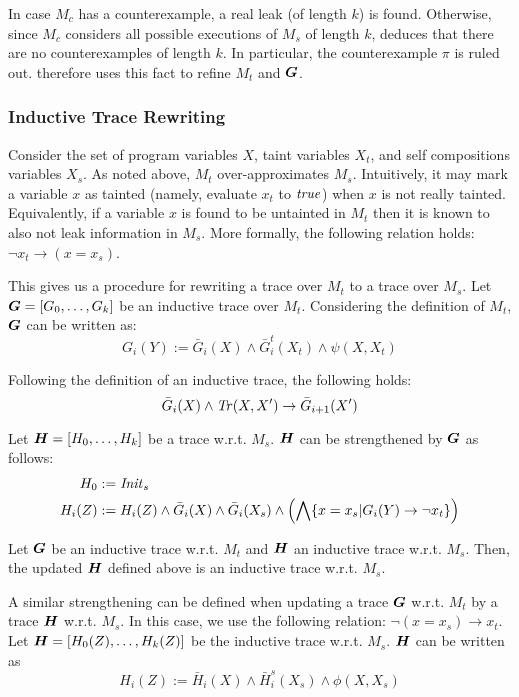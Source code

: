 In case $M_c$ has a counterexample, a real leak (of length $k$) is found. Otherwise, since $M_c$ considers all possible executions of $M_s$ of length $k$, \Ifc deduces that there are no counterexamples of length $k$. In particular, the counterexample $\pi$ is ruled out. \Ifc therefore uses this fact to refine $M_t$ and $\vG$.

\subsubsection{Inductive Trace Rewriting}

Consider the set of program variables $X$, taint variables $X_t$, and self compositions variables $X_s$. As noted above, $M_t$ over-approximates $M_s$. Intuitively, it may mark a variable $x$ as tainted (namely, evaluate $x_t$ to $\mathit{true}$) when $x$ is not really tainted. Equivalently, if a variable $x$ is found 
to be untainted in $M_t$ then it is known to also not leak information in $M_s$. More formally, the following relation holds: $\neg x_t\to  (x = x_s)$.

This gives us a procedure for rewriting a trace over $M_t$ to a trace over $M_s$. Let $\vG=[G_0,\ldots,G_k]$
be an inductive trace over $M_t$. Considering the definition of $M_t$, $\vG$ can be written as:
$$ G_i(Y) := \bar{G}_i(X)\land \bar{G}^t_i(X_t)\land\psi(X,X_t) $$

Following the definition of an inductive trace, the following holds:
$$\bar{G}_i(X)  \land \mathit{Tr}(X,X') \to \bar{G}_{i+1}(X')$$


Let $\vH = [H_0,\ldots,H_k]$ be a trace w.r.t. $M_s$. $\vH$ can be strengthened by $\vG$ as follows: 
\begin{align}
    H_0 &:= \mathit{Init}_s \\
    H_i(Z) &:= H_i(Z)\land \bar{G}_i(X)\land\bar{G}_i(X_s)\land\left(\bigwedge\{x = x_s | G_i(Y)\to\neg x_t \}\right)
\end{align}

\begin{lemma}
Let $\vG$ be an inductive trace w.r.t. $M_t$ and $\vH$ an inductive trace w.r.t. $M_s$. Then, the updated $\vH$ defined above is an inductive trace w.r.t. $M_s$.
\end{lemma}

A similar strengthening can be defined when updating a trace $\vG$ w.r.t. $M_t$ by a trace $\vH$ w.r.t. $M_s$. In this case, we use the following relation: $\neg(x = x_s)\to x_t$. Let $\vH=[H_0(Z),\ldots,H_k(Z)]$ be the inductive trace w.r.t. $M_s$. $\vH$ can be written as
$$H_i(Z) := \bar{H}_i(X)\land \bar{H}_i^s(X_s)\land \phi(X,X_s)$$


